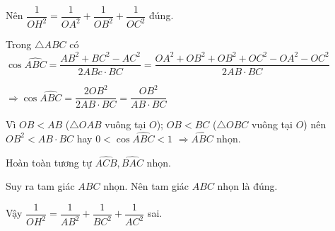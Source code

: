 \begin{ex}
{		 Nên $\dfrac{1}{OH^2}=\dfrac{1}{OA^2}+\dfrac{1}{OB^2}+\dfrac{1}{OC^2}$ đúng.
		
		\smallskip
		
		Trong $\triangle ABC$ có $\cos \widehat{ABC}=\dfrac{AB^2+BC^2-AC^2}{2ABc\cdot BC}=\dfrac{OA^2+OB^2+OB^2+OC^2-OA^2-OC^2}{2AB\cdot BC}$
		
		$\Rightarrow \cos  \widehat{ABC}=\dfrac{2OB^2}{2AB\cdot BC}=\dfrac{OB^2}{AB\cdot BC} $
		
		Vì $OB<AB$ ($\triangle OAB$ vuông tại $O$); $OB<BC$ ($\triangle OBC$ vuông tại $O$) nên $OB^2<AB\cdot BC$ hay $0<\cos \widehat{ABC}<1$ $\Rightarrow \widehat{ABC}$ nhọn.
		
		Hoàn toàn tương tự  $\widehat{ACB}, \widehat{BAC}$ nhọn.
	
		Suy ra tam giác $ABC$ nhọn. Nên tam giác $ABC$ nhọn là đúng.
	
		Vậy $\dfrac{1}{OH^2}=\dfrac{1}{AB^2}+\dfrac{1}{BC^2}+\dfrac{1}{AC^2}$ sai.
	}
\end{ex}

